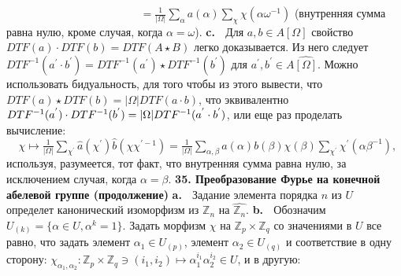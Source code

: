 \documentclass{../../template/mai_book}
\begin{document}
$\;\;\;\;\;\;\;\;\;\;\,\;\;\;\;\;\;\;\;\;\;\;\;\;\;\;\;\;\;\;\;\;\;\;\;\;\;\;\;\;\;\;\;\;= \frac{1}{|\Omega|}\sum \limits_{\alpha}a(\alpha)\sum \limits_{\chi}\chi(\alpha \omega^{-1})$ \newline \newline
(внутренняя сумма равна нулю, кроме случая, когда $\alpha = \omega$). \newline \newline \indent
\textbf{c.} $\;$ Для $a,b \in A[\Omega]$ свойство $DTF(a) \cdot DTF(b) = DTF(A \star B)$ легко доказывается. Из него следует $DTF^{-1}(a^{'} \cdot b^{'}) = DTF^{-1}(a^{'}) \star DTF^{-1}(b^{'})$ для $a^{'},b^{'} \in A \widehat{[\Omega]}$. Можно использовать бидуальность, для того чтобы из этого вывести, что $DTF(a) \star DTF(b) = |\Omega|DTF(a \cdot b)$, что эквивалентно $DTF^{-1}(a^{'}) \cdot DTF^{-1}(b^{'}) = |\Omega| \\ DTF^{-1}(a^{'} \cdot b^{'})$, или еще раз проделать вычисление: \newline \newline \indent
$\;\;\;\; \chi \longmapsto \frac{1}{|\Omega|}\sum \limits_{\chi^{'}}\hat a (\chi^{'})\hat b (\chi \chi^{'-1}) = \frac{1}{|\Omega|}\sum \limits_{\alpha , \beta}a(\alpha)b(\beta)\chi (\beta)\sum \limits_{\chi^{'}}\chi^{'}(\alpha \beta^{-1}),$ \newline \newline\newline 
используя, разумеется, тот факт, что внутренняя сумма равна нулю, за исключением случая, когда $\alpha = \beta$. \newline \newline
\textbf{35.  Преобразование Фурье на конечной абелевой группе \newline \indent (продолжение)} \newline \newline \indent
\textbf{a.} $\;$ Задание элемента порядка $n$ из $U$ определет канонический изоморфизм из $\mathds{Z}_n$ на $\widehat{\mathds{Z}_n}$. \newline \newline \indent
\textbf{b.} $\;$ Обозначим $U_{(k)} = \{\alpha \in U, \alpha^{k} = 1\}$. Задать морфизм $\chi$ на $\mathds{Z}_p \times \mathds{Z}_q$ со значениями в $U$ все равно, что задать элемент $\alpha_1 \in U_{(p)}$, элемент $\alpha_2 \in U_{(q)}$ и соответствие в одну сторону: $\chi_{\alpha_1 , \alpha_2} : \mathds{Z}_p \times \mathds{Z}_q \ni (i_1 , i_2) \longmapsto \alpha_1^{i_1}\alpha_2^{i_2} \in U$, и в другую: \newline \newline \indent
\end{document}
